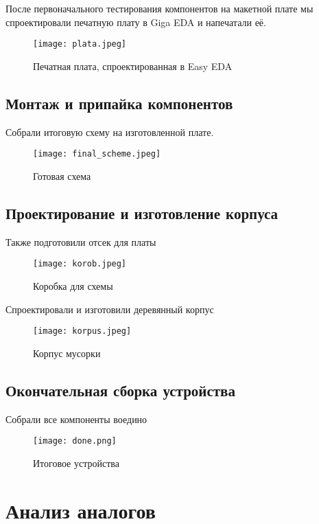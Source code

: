 \documentclass[a4paper, 12pt]{article} %
\begin{document}
После первоначального тестирования компонентов на макетной плате мы спроектировали печатную плату в Giga EDA и напечатали её.

\begin{figure}[H]
    \centering
    \texttt{[image: plata.jpeg]}
    \caption{Печатная плата, спроектированная в Easy EDA}
\end{figure}

\subsection*{Монтаж и припайка компонентов}

Собрали итоговую схему на изготовленной плате.

\begin{figure}[H]
    \centering
    \texttt{[image: final\_scheme.jpeg]}
    \caption{Готовая схема}
\end{figure}


\subsection*{Проектирование и изготовление корпуса}


Также подготовили отсек для платы

\begin{figure}[H]
    \centering
    \texttt{[image: korob.jpeg]}
    \caption{Коробка для схемы}
\end{figure}

Спроектировали и изготовили деревянный корпус

\begin{figure}[H]
    \centering
    \texttt{[image: korpus.jpeg]}
    \caption{Корпус мусорки}
\end{figure}

\subsection*{Окончательная сборка устройства}

Собрали все компоненты воедино 

\begin{figure}[H]
    \centering
    \texttt{[image: done.png]}
    \caption{Итоговое устройства}
\end{figure}

\section{Анализ аналогов}
\end{document}
